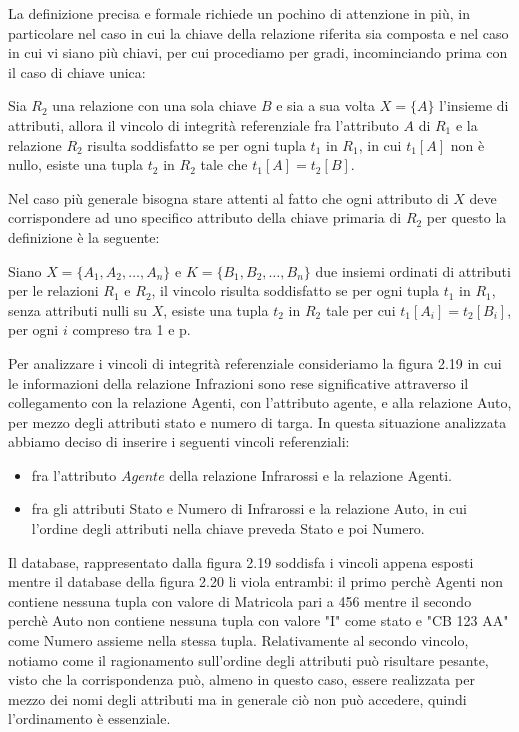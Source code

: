\documentclass[a4paper,12pt, oneside]{book}
\begin{document}
\begin{itemize}
        La definizione precisa e formale richiede un pochino di attenzione in più, in particolare nel caso in
        cui la chiave della relazione riferita sia composta e nel caso in cui vi siano più chiavi, per cui
        procediamo per gradi, incominciando prima con il caso di chiave unica:
        \begin{definizione}
            Sia $R_2$ una relazione con una sola chiave $B$ e sia a sua volta $X = \{A\}$ l'insieme di
            attributi, allora il vincolo di integrità referenziale fra l'attributo $A$ di $R_1$ e la relazione
            $R_2$ risulta soddisfatto se per ogni tupla $t_1$ in $R_1$, in cui $t_1[A]$ non è nullo, esiste una
            tupla $t_2$ in $R_2$ tale che $t_1[A] = t_2[B]$.
        \end{definizione}
        Nel caso più generale bisogna stare attenti al fatto che ogni attributo di $X$ deve corrispondere ad
        uno specifico attributo della chiave primaria di $R_2$ per questo la definizione è la seguente:
        \begin{definizione}
            Siano $X = \{A_1, A_2, \dots, A_n\}$ e $K = \{B_1, B_2, \dots, B_n\}$ due insiemi ordinati di
            attributi per le relazioni $R_1$ e $R_2$, il vincolo risulta soddisfatto se per ogni tupla $t_1$
            in $R_1$, senza attributi nulli su $X$, esiste una tupla $t_2$ in $R_2$ tale per cui $t_1[A_i] =
            t_2[B_i]$, per ogni $i$ compreso tra 1 e p.
        \end{definizione}
        Per analizzare i vincoli di integrità referenziale consideriamo la figura 2.19 in cui le informazioni 
        della relazione Infrazioni sono rese significative attraverso il collegamento con la relazione Agenti,
        con l'attributo agente, e alla relazione Auto, per mezzo degli attributi stato e numero di targa.\newline
        In questa situazione analizzata abbiamo deciso di inserire i seguenti vincoli referenziali:
        \begin{itemize}
            \item fra l'attributo $Agente$ della relazione Infrarossi e la relazione Agenti.
            \item fra gli attributi Stato e Numero di Infrarossi e la relazione Auto, in cui l'ordine degli
                attributi nella chiave preveda Stato e poi Numero.
        \end{itemize}
        Il database, rappresentato dalla figura 2.19 soddisfa i vincoli appena esposti mentre il database
        della figura 2.20 li viola entrambi: il primo perchè Agenti non contiene nessuna tupla con valore di
        Matricola pari a 456 mentre il secondo perchè Auto non contiene nessuna tupla con valore "I" come
        stato e "CB 123 AA" come Numero assieme nella stessa tupla.\newline
        Relativamente al secondo vincolo, notiamo come il ragionamento sull'ordine degli attributi può
        risultare pesante, visto che la corrispondenza può, almeno in questo caso, essere realizzata per mezzo
        dei nomi degli attributi ma in generale ciò non può accedere, quindi l'ordinamento è essenziale.


\end{itemize}
\end{document}

